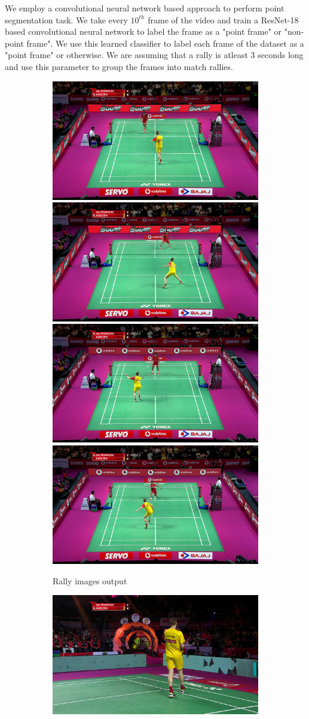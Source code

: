 \documentclass[runningheads,a4paper]{llncs}
\begin{document}
We employ a convolutional neural network based approach to perform point segmentation task. We take every $10^{th}$ frame of the video and train a ResNet-18 \cite{he2016deep} based convolutional neural network to label the frame as a "point frame" or "non-point frame". We use this learned classifier to label each frame of the dataset as a "point frame" or otherwise. We are assuming that a rally is atleast 3 seconds long and use this parameter to group the frames into match rallies.

\begin{figure}[h]
    \centering
    \begin{subfigure}{\linewidth}
        \includegraphics[width=.25\linewidth, height=.2\linewidth]{Images/rally1.png}\hfill
        \includegraphics[width=.25\linewidth, height=.2\linewidth]{Images/rally2.png}\hfill
        \includegraphics[width=.25\linewidth, height=.2\linewidth]{Images/rally3.png}\hfill
        \includegraphics[width=.25\linewidth, height=.2\linewidth]{Images/rally4.png}
        \caption{\label{fig:rallyimg} Rally images output}
    \end{subfigure}\par\medskip
    \begin{subfigure}{\linewidth}
        \includegraphics[width=.25\linewidth, height=.2\linewidth]{Images/nonrally1.png}\hfill

\end{subfigure}
\end{figure}
\end{document}
